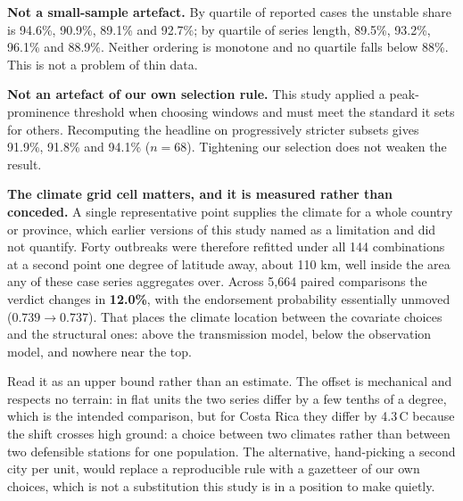 \documentclass[11pt,a4paper]{article}
\begin{document}
\textbf{Not a small-sample artefact.} By quartile of reported cases the unstable
share is 94.6\%, 90.9\%, 89.1\% and 92.7\%; by quartile of series length,
89.5\%, 93.2\%, 96.1\% and 88.9\%. Neither ordering is monotone and no quartile
falls below 88\%. This is not a problem of thin data.

\textbf{Not an artefact of our own selection rule.} This study applied a
peak-prominence threshold when choosing windows and must meet the standard it
sets for others. Recomputing the headline on progressively stricter subsets gives
91.9\%, 91.8\% and 94.1\% ($n=68$). Tightening our selection does not weaken the
result.

\textbf{The climate grid cell matters, and it is measured rather than conceded.}
A single representative point supplies the climate for a whole country or
province, which earlier versions of this study named as a limitation and did not
quantify. Forty outbreaks were therefore refitted under all 144 combinations at a
second point one degree of latitude away, about 110 km, well inside the area
any of these case series aggregates over. Across 5{,}664 paired comparisons the
verdict changes in \textbf{12.0\%}, with the endorsement probability essentially
unmoved ($0.739 \to 0.737$). That places the climate location between the
covariate choices and the structural ones: above the transmission model, below
the observation model, and nowhere near the top.

Read it as an upper bound rather than an estimate. The offset is mechanical and
respects no terrain: in flat units the two series differ by a few tenths of a
degree, which is the intended comparison, but for Costa Rica they differ by
4.3\,\textdegree C because the shift crosses high ground: a choice between two
climates rather than between two defensible stations for one population. The
alternative, hand-picking a second city per unit, would replace a reproducible
rule with a gazetteer of our own choices, which is not a substitution this study
is in a position to make quietly.
\end{document}
